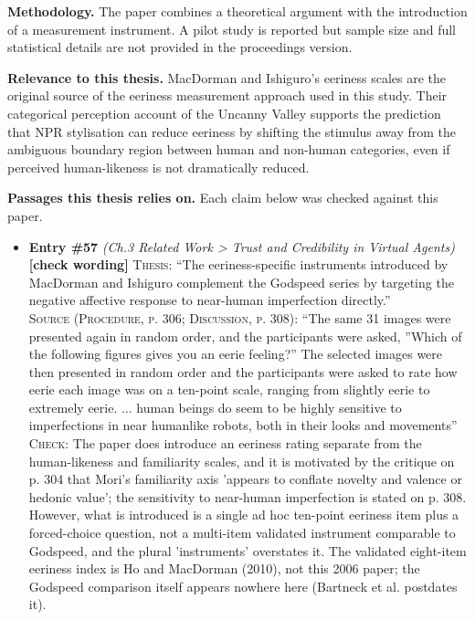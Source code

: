 \documentclass[11pt, a4paper]{article}
\begin{document}
\textbf{Methodology.} The paper combines a theoretical argument with the introduction of a measurement instrument. A pilot study is reported but sample size and full statistical details are not provided in the proceedings version.

\textbf{Relevance to this thesis.} MacDorman and Ishiguro's eeriness scales are the original source of the eeriness measurement approach used in this study. Their categorical perception account of the Uncanny Valley supports the prediction that NPR stylisation can reduce eeriness by shifting the stimulus away from the ambiguous boundary region between human and non-human categories, even if perceived human-likeness is not dramatically reduced.


\textbf{Passages this thesis relies on.} Each claim below was checked against this paper.
\begin{itemize}[leftmargin=1.2em,itemsep=4pt]
\item \textbf{Entry \#57} \textit{(Ch.3 Related Work > Trust and Credibility in Virtual Agents)}\\
\textcolor{partialorange}{\textbf{[check wording]}} \textsc{Thesis:} ``The eeriness-specific instruments introduced by MacDorman and Ishiguro complement the Godspeed series by targeting the negative affective response to near-human imperfection directly.''\\
\textsc{Source (Procedure, p. 306; Discussion, p. 308):} ``The same 31 images were presented again in random order, and the participants were asked, ”Which of the following figures gives you an eerie feeling?” The selected images were then presented in random order and the participants were asked to rate how eerie each image was on a ten-point scale, ranging from slightly eerie to extremely eerie. ... human beings do seem to be highly sensitive to imperfections in near humanlike robots, both in their looks and movements''\\
\textsc{Check:} The paper does introduce an eeriness rating separate from the human-likeness and familiarity scales, and it is motivated by the critique on p. 304 that Mori's familiarity axis 'appears to conflate novelty and valence or hedonic value'; the sensitivity to near-human imperfection is stated on p. 308. However, what is introduced is a single ad hoc ten-point eeriness item plus a forced-choice question, not a multi-item validated instrument comparable to Godspeed, and the plural 'instruments' overstates it. The validated eight-item eeriness index is Ho and MacDorman (2010), not this 2006 paper; the Godspeed comparison itself appears nowhere here (Bartneck et al. postdates it).
\end{itemize}
\end{document}
